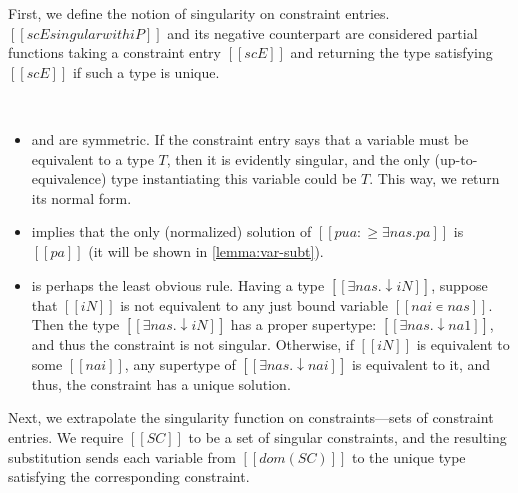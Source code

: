 \documentclass[acmsmall,natbib=false,review,anonymous]{acmart}
\begin{document}
First, we define the notion of singularity on constraint entries. 
$[[scE singular with iP]]$ and its negative counterpart 
are considered partial functions taking a constraint entry $[[scE]]$
and returning the type satisfying $[[scE]]$ if such a type is unique. 

\begin{algorithm}
  \hfill\\
  \ottdefnSINGscEPLabeled{}
  \ottdefnSINGscENLabeled{}
\end{algorithm}

\begin{itemize}
  \item {} and  
    are symmetric. If the constraint entry says that a variable must be equivalent to 
    a type $T$, then it is evidently singular, and the only (up-to-equivalence) type
    instantiating this variable could be $T$. This way, we return its normal form. 
  \item {}
    implies that the only (normalized) solution of $[[pua :≥ ∃nas.pa]]$ is 
    $[[pa]]$ (it will be shown in \cref{lemma:var-subt}).
  \item {}
    is perhaps the least obvious rule.
    Having a type $[[∃nas.↓iN]]$, suppose that $[[iN]]$ is
    not equivalent to any just bound variable $[[nai ∊ {nas}]]$.
    Then the type $[[∃nas.↓iN]]$ has a proper supertype: $[[∃nas.↓na1]]$,
    and thus the constraint is not singular.
    Otherwise, if $[[iN]]$ is equivalent to some $[[nai]]$,
    any supertype of $[[∃nas.↓nai]]$ is equivalent to it, and thus, 
    the constraint has a unique solution.
\end{itemize}

Next, we extrapolate the singularity function on constraints---sets of constraint entries. 
We require $[[SC]]$ to be a set of singular constraints, and the resulting substitution
sends each variable from $[[dom(SC)]]$ to the unique type satisfying the corresponding constraint.
\end{document}
